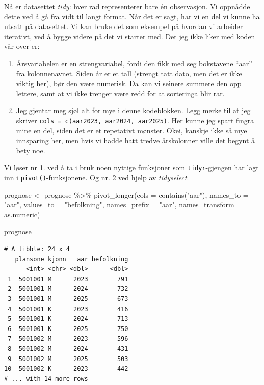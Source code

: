 \documentclass[
  letterpaper,
  DIV=11,
  numbers=noendperiod]{scrreprt}
\newenvironment{Shaded}{\begin{snugshade}}{\end{snugshade}}
\newcommand{\AttributeTok}[1]{\textcolor[rgb]{0.40,0.45,0.13}{#1}}
\newcommand{\FunctionTok}[1]{\textcolor[rgb]{0.28,0.35,0.67}{#1}}
\newcommand{\NormalTok}[1]{\textcolor[rgb]{0.00,0.23,0.31}{#1}}
\newcommand{\OtherTok}[1]{\textcolor[rgb]{0.00,0.23,0.31}{#1}}
\newcommand{\SpecialCharTok}[1]{\textcolor[rgb]{0.37,0.37,0.37}{#1}}
\newcommand{\StringTok}[1]{\textcolor[rgb]{0.13,0.47,0.30}{#1}}
\providecommand{\tightlist}{%
  \setlength{\itemsep}{0pt}\setlength{\parskip}{0pt}}\usepackage{longtable,booktabs,array}
\begin{document}
Nå er datasettet \emph{tidy}: hver rad representerer bare én
observasjon. Vi oppnådde dette ved å gå fra vidt til langt format. Når
det er sagt, har vi en del vi kunne ha utsatt på datasettet. Vi kan
bruke det som eksempel på hvordan vi arbeider iterativt, ved å bygge
videre på det vi starter med. Det jeg ikke liker med koden vår over er:

\begin{enumerate}
\def\labelenumi{\arabic{enumi}.}
\tightlist
\item
  Årsvariabelen er en strengvariabel, fordi den fikk med seg bokstavene
  ``aar'' fra kolonnenavnet. Siden år er et tall (strengt tatt dato, men
  det er ikke viktig her), bør den være numerisk. Da kan vi seinere
  summere den opp lettere, samt at vi ikke trenger være redd for at
  sorteringa blir rar.
\item
  Jeg gjentar meg sjøl alt for mye i denne kodeblokken. Legg merke til
  at jeg skriver \texttt{cols\ =\ c(aar2023,\ aar2024,\ aar2025)}. Her
  kunne jeg spart fingra mine en del, siden det er et repetativt
  mønster. Okei, kanskje ikke så mye innsparing her, men hvis vi hadde
  hatt tredve årskolonner ville det begynt å bety noe.
\end{enumerate}

Vi løser nr 1. ved å ta i bruk noen nyttige funksjoner som
\texttt{tidyr}-gjengen har lagt inn i \texttt{pivot()}-funksjonene. Og
nr. 2 ved hjelp av \emph{tidyselect}.

\begin{Shaded}
\begin{Highlighting}[]
\NormalTok{prognose }\OtherTok{\textless{}{-}}\NormalTok{ prognose }\SpecialCharTok{\%\textgreater{}\%} 
  \FunctionTok{pivot\_longer}\NormalTok{(}\AttributeTok{cols =} \FunctionTok{contains}\NormalTok{(}\StringTok{"aar"}\NormalTok{), }
               \AttributeTok{names\_to =} \StringTok{"aar"}\NormalTok{, }
               \AttributeTok{values\_to =} \StringTok{"befolkning"}\NormalTok{, }
               \AttributeTok{names\_prefix =} \StringTok{"aar"}\NormalTok{,}
               \AttributeTok{names\_transform =}\NormalTok{ as.numeric)}

\NormalTok{prognose}
\end{Highlighting}
\end{Shaded}

\begin{verbatim}
# A tibble: 24 x 4
   plansone kjonn   aar befolkning
      <int> <chr> <dbl>      <dbl>
 1  5001001 M      2023        791
 2  5001001 M      2024        732
 3  5001001 M      2025        673
 4  5001001 K      2023        416
 5  5001001 K      2024        713
 6  5001001 K      2025        750
 7  5001002 M      2023        596
 8  5001002 M      2024        431
 9  5001002 M      2025        503
10  5001002 K      2023        442
# ... with 14 more rows
\end{verbatim}
\end{document}
